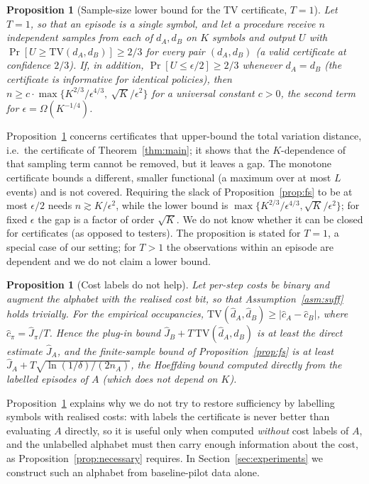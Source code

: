 \documentclass{article}
\newtheorem{proposition}[theorem]{Proposition}
\newcommand{\TV}{\mathrm{TV}}
\begin{document}
\begin{proposition}[Sample-size lower bound for the TV certificate, $T=1$]\label{prop:lower}
Let $T=1$, so that an episode is a single symbol, and let a procedure receive $n$ independent samples from each of $d_A,d_B$ on $K$ symbols and output $U$ with $\Pr[U\ge\TV(d_A,d_B)]\ge 2/3$ for every pair $(d_A,d_B)$ (a valid certificate at confidence $2/3$). If, in addition, $\Pr[U\le\epsilon/2]\ge2/3$ whenever $d_A=d_B$ (the certificate is informative for identical policies), then $n\ge c\cdot\max\{K^{2/3}/\epsilon^{4/3},\ \sqrt K/\epsilon^{2}\}$ for a universal constant $c>0$, the second term for $\epsilon=\Omega(K^{-1/4})$.
\end{proposition}

Proposition~\ref{prop:lower} concerns certificates that upper-bound the total variation distance, i.e.\ the certificate of Theorem~\ref{thm:main}; it shows that the $K$-dependence of that sampling term cannot be removed, but it leaves a gap. The monotone certificate bounds a different, smaller functional (a maximum over at most $L$ events) and is not covered. Requiring the slack of Proposition~\ref{prop:fs} to be at most $\epsilon/2$ needs $n\gtrsim K/\epsilon^2$, while the lower bound is $\max\{K^{2/3}/\epsilon^{4/3},\sqrt K/\epsilon^2\}$; for fixed $\epsilon$ the gap is a factor of order $\sqrt K$. We do not know whether it can be closed for certificates (as opposed to testers). The proposition is stated for $T=1$, a special case of our setting; for $T>1$ the observations within an episode are dependent and we do not claim a lower bound.

\begin{proposition}[Cost labels do not help]\label{prop:labels}
Let per-step costs be binary and augment the alphabet with the realised cost bit, so that Assumption~\ref{asm:suff} holds trivially. For the empirical occupancies, $\TV(\hat d_A,\hat d_B)\ge|\hat c_A-\hat c_B|$, where $\hat c_\pi=\hat J_\pi/T$. Hence the plug-in bound $\hat J_B+T\,\TV(\hat d_A,\hat d_B)$ is at least the direct estimate $\hat J_A$, and the finite-sample bound of Proposition~\ref{prop:fs} is at least $\hat J_A+T\sqrt{\ln(1/\delta)/(2n_A)}$, the Hoeffding bound computed directly from the labelled episodes of $A$ (which does not depend on $K$).
\end{proposition}

Proposition~\ref{prop:labels} explains why we do not try to restore sufficiency by labelling symbols with realised costs: with labels the certificate is never better than evaluating $A$ directly, so it is useful only when computed \emph{without} cost labels of $A$, and the unlabelled alphabet must then carry enough information about the cost, as Proposition~\ref{prop:necessary} requires. In Section~\ref{sec:experiments} we construct such an alphabet from baseline-pilot data alone.
\end{document}

